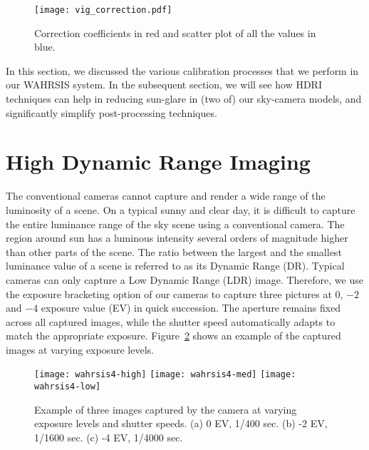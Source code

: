 \begin{figure}[htb]
\centering
\texttt{[image: vig\_correction.pdf]}
\caption{Correction coefficients in red and scatter plot of all the values in blue.}
\label{fig:coefficients}
\end{figure}

In this section, we discussed the various calibration processes that we perform in our WAHRSIS system. In the subsequent section, we will see how HDRI techniques can help in reducing sun-glare in (two of) our sky-camera models, and significantly simplify post-processing techniques. 

\section{High Dynamic Range Imaging} 
\label{sec:HDR-WAHRSIS}
The conventional cameras cannot capture and render a wide range of the luminosity of a scene. On a typical sunny and clear day, it is difficult to capture the entire luminance range of the sky scene using a conventional camera. The region around sun has a luminous intensity several orders of magnitude higher than other parts of the scene. The ratio between the largest and the smallest luminance value of a scene is referred to as its Dynamic Range (DR). Typical cameras can only capture a Low Dynamic Range (LDR) image. Therefore, we use the exposure bracketing option of our cameras to capture three pictures at $0$, $-2$ and $-4$ exposure value (EV) in quick succession. The aperture remains fixed across all captured images, while the shutter speed automatically adapts to match the appropriate exposure. Figure~\ref{fig:ldr-input} shows an example of the captured images at varying exposure levels. 


\begin{figure}[htb]
\centering
\texttt{[image: wahrsis4-high]}\hspace{0.5mm}    
\texttt{[image: wahrsis4-med]}\hspace{0.5mm} 
\texttt{[image: wahrsis4-low]}\hspace{0.5mm}\\
\caption[Example of three LDR images captured by sky camera.]{Example of three images captured by the camera at varying exposure levels and shutter speeds. (a) 0 EV, 1/400 sec. (b) -2 EV, 1/1600 sec. (c) -4 EV, 1/4000 sec.}
\label{fig:ldr-input}
\end{figure}

